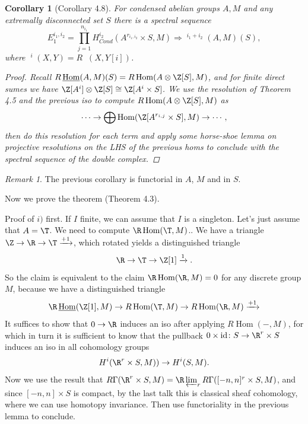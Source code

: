 \documentclass[A4paper, british]{amsart}
\theoremstyle{darkgreentheorem}
\newtheorem{cor}[thm]{Corollary}
\theoremstyle{darkbluedefinition}
\theoremstyle{darkredexample}
\theoremstyle{remark}
\newtheorem{rem}[thm]{Remark}
\DeclareMathOperator{\Hom}{Hom}
\DeclareMathOperator{\ihom}{\underline{Hom}}
\DeclareMathOperator{\iext}{\underline{Ext}}
\newcommand{\1}{\mathbbm{1}}
\newcommand{\ot}{\otimes}
\newcommand{\id}{\mathrm{id}}
\newcommand{\tms}{\times}
\begin{document}
\begin{cor}[Corollary 4.8]
    For condensed abelian groups $A,M$ and any extremally disconnected set $S$ there is a spectral sequence
    \[ E_{1}^{i_{1},i_{2}}=\prod_{j=1}^{n_{i_{1}}}H^{i_{2}}_{Cond}(A^{r_{i_{1},i_{2}}}\tms S,M)\Rightarrow \iext^{i_{1}+i_{2}}(A,M)(S),\]
    where $\iext^{i}(X,Y)=R\ihom(X,Y[i])$.
    \begin{proof}
	Recall $R\ihom(A,M)(S)=R\Hom(A\ot\Z[S],M)$, and for finite direct sumes we have $\Z[A^{i}]\ot \Z[S]\cong \Z[A^{i}\tms S]$.
	We use the resolution of Theorem 4.5 and the previous iso to compute $R\Hom(A\ot \Z[S],M)$ as
	\[ \cdots \to \bigoplus \Hom(\Z[A^{r_{i,j}}\tms S],M)\to \cdots, \]
	then do this resolution for each term and apply some horse-shoe lemma on projective resolutions on the LHS of the previous homs to conclude with the spectral sequence of the double complex.
    \end{proof}
\end{cor}

\begin{rem}
    The previous corollary is functorial in $A$, $M$ and in $S$.
\end{rem}

Now we prove the theorem (Theorem 4.3).

Proof of $i)$ first.
If $I$ finite, we can assume that $I$ is a singleton.
Let's just assume that $A=\T$.
We need to compute $\R\Hom(\T,M)$..
We have a triangle $\Z\to \R\to \T\xrightarrow{+1}$, which rotated yields a distinguished triangle
\[ \R\to \T\to \Z[1]\xrightarrow{1}.\]
So the claim is equivalent to the claim $\R\Hom(\R,M)=0$ for any discrete group $M$, because we have a distinguished triangle
\[ \R\ihom(\Z[1],M)\to R\Hom(\T,M)\to R\Hom(\R,M) \xrightarrow{+1}\]
It suffices to show that $0\to \R$ induces an iso after applying $R\Hom(-,M)$, for which in turn it is sufficient to know that the pullback $0\times \id \colon S\to \R^{r}\times S$ induces an iso in all cohomology groups
\[ H^{i}(\R^{r}\times S,M))\to H^{i}(S,M). \]
Now we use the result that $R\Gamma(\R^{r}\tms S,M)=\R\varprojlim_{r}R\Gamma([-n,n]^{r}\tms S,M)$, and since $[-n,n]\tms S$ is compact, by the last talk this is classical sheaf cohomology, where we can use homotopy invariance.
Then use functoriality in the previous lemma to conclude.
\end{document}
